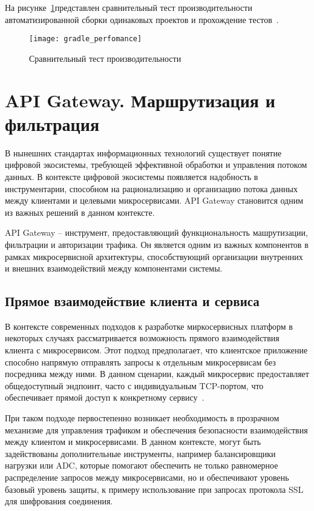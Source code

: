 На рисунке~\ref{fig:performance_comparison}представлен сравнительный тест производительности автоматизированной сборки одинаковых проектов и прохождение тестов~\cite{detailed_comprasion}.

\begin{figure}[htbp]
    \centering
    \texttt{[image: gradle\_perfomance]}
    \caption{Сравнительный тест производительности}
    \label{fig:performance_comparison}
\end{figure}


\section{API Gateway. Маршрутизация и фильтрация}

В нынешних стандартах информационных технологий существует понятие цифровой экосистемы, требующей
эффективной обработки и управления потоком данных.
В контексте цифровой экосистемы появляется
надобность в инструментарии, способном на рационализацию и организацию потока данных между
клиентами и целевыми микросервисами.
API Gateway становится одним из важных решений в данном
контексте.

API Gateway -- инструмент, предоставляющий функциональность машрутизации, фильтрации и авторизации
трафика.
Он является одним из важных компонентов в рамках микросервисной архитектуры,
способствующий организации внутренних и внешних взаимодействий между компонентами системы.

\subsection{Прямое взаимодействие клиента и сервиса}

В контексте современных подходов к разработке миркосервисных платформ в некоторых случаях
рассматривается возможность прямого взаимодействия клиента с микросервисом.
Этот подход
предполагает, что клиентское приложение
способно напрямую отправлять запросы к отдельным микросервисам без посредника между ними.
В данном
сценарии, каждый микросервис предоставляет общедоступный эндпоинт, часто с индивидуальным
TCP-портом, что обеспечивает прямой доступ к конкретному сервису~\cite{trebichavsky2021api}.

При таком подходе первостепенно возникает необходимость в прозрачном механизме для управления
трафиком и обеспечения безопасности
взаимодействия между клиентом и микросервисами.
В данном контексте, могут быть задействованы
дополнительные
инструменты, например балансировщики нагрузки или ADC, которые помогают
обеспечить не только равномерное распределение запросов между микросервисами, но и обеспечивают
уровень базовый уровень защиты, к примеру использование при запросах
протокола SSL для шифрования соединения.

